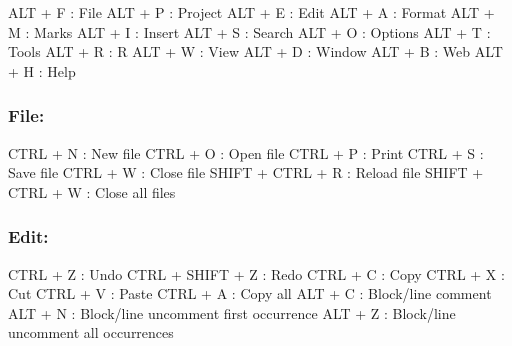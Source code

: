 \vspace{-0.5cm}
\begin{Rtables}[caption={[Main menu keyboard shortcuts]
    Main Menu keyboard shortcuts},
  label=menu:main]
  ALT + F                 : File
  ALT + P                 : Project
  ALT + E                 : Edit
  ALT + A                 : Format
  ALT + M                 : Marks
  ALT + I                 : Insert
  ALT + S                 : Search
  ALT + O                 : Options
  ALT + T                 : Tools
  ALT + R                 : R
  ALT + W                 : View
  ALT + D                 : Window
  ALT + B                 : Web
  ALT + H                 : Help
\end{Rtables}


\subsubsection{File:}

\vspace{-0.5cm}
\begin{Rtables}[caption={[File menu keyboard shortcuts]
    File menu keyboard shortcuts},
  label=menu:file]
  CTRL  + N               : New file
  CTRL  + O               : Open file
  CTRL  + P               : Print
  CTRL  + S               : Save file
  CTRL  + W               : Close file
  SHIFT + CTRL + R        : Reload file
  SHIFT + CTRL + W        : Close all files
\end{Rtables}


\subsubsection{Edit:}

\vspace{-0.5cm}
\begin{Rtables}[caption={[Edit menu keyboard shortcuts]
    Edit menu keyboard shortcuts},
  label=menu:edit]
  CTRL + Z                : Undo
  CTRL + SHIFT + Z        : Redo
  CTRL + C                : Copy
  CTRL + X                : Cut
  CTRL + V                : Paste
  CTRL + A                : Copy all
  ALT  + C                : Block/line comment
  ALT  + N                : Block/line uncomment first occurrence
  ALT  + Z                : Block/line uncomment all occurrences
\end{Rtables}


